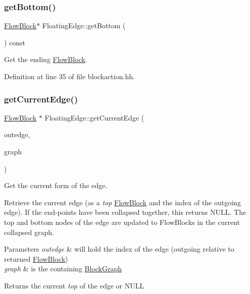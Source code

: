 \subsubsection{\texorpdfstring{getBottom()}{getBottom()}}
{\footnotesize\ttfamily \mbox{\hyperlink{class_flow_block}{Flow\+Block}}$\ast$ Floating\+Edge\+::get\+Bottom (\begin{DoxyParamCaption}\item[{void}]{ }\end{DoxyParamCaption}) const\hspace{0.3cm}{\ttfamily [inline]}}



Get the ending \mbox{\hyperlink{class_flow_block}{Flow\+Block}}. 



Definition at line 35 of file blockaction.\+hh.

\mbox{\label{class_floating_edge_afe06b54ef60e438326f48f0d466df0ff}} 
\subsubsection{\texorpdfstring{getCurrentEdge()}{getCurrentEdge()}}
{\footnotesize\ttfamily \mbox{\hyperlink{class_flow_block}{Flow\+Block}} $\ast$ Floating\+Edge\+::get\+Current\+Edge (\begin{DoxyParamCaption}\item[{int4 \&}]{outedge,  }\item[{\mbox{\hyperlink{class_flow_block}{Flow\+Block}} $\ast$}]{graph }\end{DoxyParamCaption})}



Get the current form of the edge. 

Retrieve the current edge (as a {\itshape top} \mbox{\hyperlink{class_flow_block}{Flow\+Block}} and the index of the outgoing edge). If the end-\/points have been collapsed together, this returns N\+U\+LL. The top and bottom nodes of the edge are updated to Flow\+Blocks in the current collapsed graph. 
\begin{DoxyParams}{Parameters}
{\em outedge} & will hold the index of the edge (outgoing relative to returned \mbox{\hyperlink{class_flow_block}{Flow\+Block}}) \\
\hline
{\em graph} & is the containing \mbox{\hyperlink{class_block_graph}{Block\+Graph}} \\
\hline
\end{DoxyParams}
\begin{DoxyReturn}{Returns}
the current {\itshape top} of the edge or N\+U\+LL 
\end{DoxyReturn}


